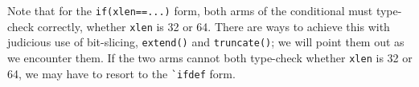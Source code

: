 Note that for the \verb|if(xlen==...)| form, both arms of the
conditional must type-check correctly, whether \verb|xlen| is 32 or
64.  There are ways to achieve this with judicious use of bit-slicing,
\verb|extend()| and \verb|truncate()|; we will point them out as we
encounter them.  If the two arms cannot both type-check whether
\verb|xlen| is 32 or 64, we may have to resort to the \verb|`ifdef|
form.

